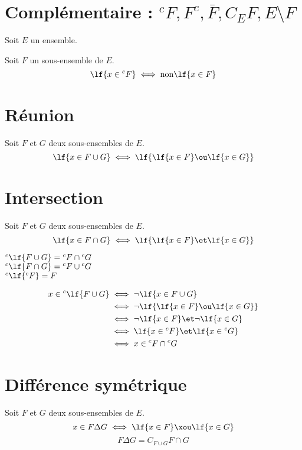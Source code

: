 \documentclass[12pt,twoside,a4paper]{article}
\author{MPSI 2}
\begin{document}
	\maketitle
	\section{Compl\'ementaire : ${^cF},F^c,\bar{F},C_EF,E\setminus F$}
		Soit $E$ un ensemble.
		\begin{defi}
			Soit $F$ un sous-ensemble de $E$.\\
			$$\lf{x\in{^cF}}\iff\text{non}\lf{x\in F}$$
		\end{defi}
	\section{R\'eunion}
		\begin{defi}
			Soit $F$ et $G$ deux sous-ensembles de $E$.
			$$\lf{x\in F\cup G}\iff\lf{\lf{x\in F}\ou\lf{x\in G}}$$
		\end{defi}
	\section{Intersection}
		\begin{defi}
			Soit $F$ et $G$ deux sous-ensembles de $E$.
			$$\lf{x\in F\cap G}\iff\lf{\lf{x\in F}\et\lf{x\in G}}$$
		\end{defi}
		\begin{prop}
			${^c\lf{F\cup G}}={^cF}\cap{^cG}$ \\
			${^c\lf{F\cap G}}={^cF}\cup{^cG}$ \\
			${^c\lf{^cF}}=F$
		\end{prop}
		\begin{preuve}
			$$\begin{aligned}
				x\in{^c\lf{F\cup G}}&\iff\neg\lf{x\in F\cup G} \\
									&\iff\neg\lf{\lf{x\in F}\ou\lf{x\in G}} \\
									&\iff\neg\lf{x\in F}\et\neg\lf{x\in G} \\
									&\iff\lf{x\in{^cF}}\et\lf{x\in{^cG}} \\
									&\iff x\in{^cF}\cap{^cG}
			\end{aligned}$$
		\end{preuve}
	\section{Diff\'erence sym\'etrique}
		\begin{defi}
			Soit $F$ et $G$ deux sous-ensembles de $E$. \\
			$$x\in F\Delta G\iff\lf{x\in F}\xou\lf{x\in G}$$
			$$F\Delta G=C_{F\cup G}F\cap G$$
		\end{defi}
\end{document}

